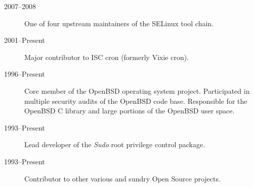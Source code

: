 
\begin{description}
\item[2007--2008] One of four upstream maintainers of the SELinux tool chain.
\item[2001--Present] Major contributor to ISC cron (formerly Vixie cron).
\item[1996--Present] Core member of the OpenBSD operating system project.  Participated in multiple security audits of the OpenBSD code base.  Responsible for the OpenBSD C library and large portions of the OpenBSD user space.
\item[1993--Present] Lead developer of the \emph{Sudo} root privilege control package.
\item[1993--Present] Contributor to other various and sundry Open Source projects.
\end{description}







